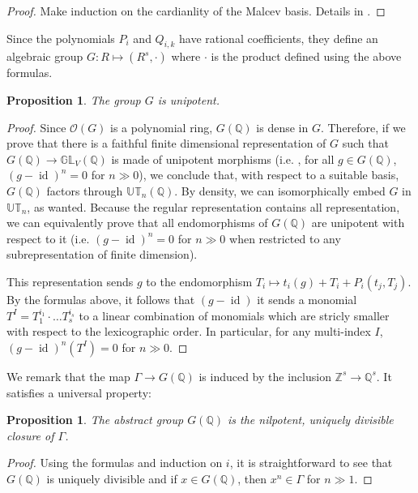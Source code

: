 \documentclass{amsart}
\newtheorem{prop}[thm]{Proposition}
\theoremstyle{definition}
\theoremstyle{remark}
\theoremstyle{remark}
\newcommand{\Q}{\mathbb{Q}}
\newcommand{\Z}{\mathbb{Z}}
\newcommand{\ra}{\rightarrow}
\newcommand{\mcO}{\mathcal{O}}
\DeclareMathOperator{\id}{id}
\begin{document}
\begin{proof}
Make induction on the cardianlity of the Malcev basis. Details in \cite[Propri\'et\'e 3.1.5]{suisse}.
\end{proof}

Since the polynomials $P_{i}$ and $Q_{i,k}$ have rational coefficients, they define an algebraic group $G\colon R\mapsto (R^s,\cdot)$ where $\cdot$ is the product defined using the above formulas. 

\begin{prop}
The group $G$ is unipotent.
\end{prop}

\begin{proof}
Since $\mcO(G)$ is a polynomial ring, $G(\Q)$ is dense in $G$. Therefore, if we prove that there is a faithful finite dimensional representation of $G$ such that $G(\Q)\ra\mathbb{GL}_{V}(\Q)$ is made of unipotent morphisms (i.e. , for all $g\in G(\Q)$, $(g-\id)^n=0$ for $n\gg0$), we conclude that, with respect to a suitable basis, $G(\Q)$ factors through $\mathbb{UT}_n(\Q)$. By density, we can isomorphically embed $G$ in $\mathbb{UT}_n$, as wanted. Because the regular representation contains all representation, we can equivalently prove that all endomorphisms of $G(\Q)$ are unipotent with respect to it (i.e. $(g-\id)^n=0$ for $n\gg0$ when restricted to any subrepresentation of finite dimension).

This representation sends $g$ to the endomorphism $T_i\mapsto t_i(g)+T_i+P_i(t_j,T_j)$. By the formulas above, it follows that $(g-\id)$ it sends a monomial $T^I=T_1^{i_1}\cdot\ldots T_s^{i_s}$ to a linear combination of monomials which are stricly smaller with respect to the lexicographic order. In particular, for any multi-index $I$, $(g-\id)^n(T^I)=0$ for $n\gg0$. 
\end{proof}

We remark that the map $\Gamma\ra G(\Q)$ is induced by the inclusion $\Z^s\ra\Q^s$. It satisfies a universal property:

\begin{prop}
The abstract group $G(\Q)$ is the nilpotent, uniquely divisible closure of $\Gamma$.
\end{prop}

\begin{proof}
Using the formulas and induction on $i$, it is straightforward to see that $G(\Q)$ is uniquely divisible and if $x\in G(\Q)$, then $x^n\in\Gamma$ for $n\gg1$.
\end{proof}
\end{document}
